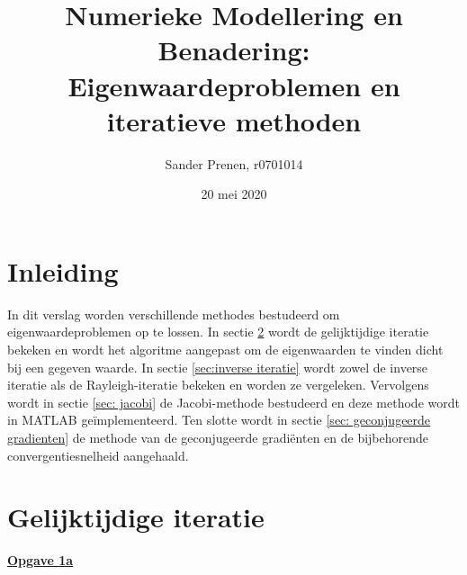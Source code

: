 \documentclass[a4paper, 12pt, titlepage, fleqn]{article}
\begin{document}
\title{\textbf{Numerieke Modellering en Benadering: Eigenwaardeproblemen en iteratieve methoden}}
\author{Sander Prenen, r0701014}

\date{20 mei 2020}
\begin{titlepage}
	\maketitle
	\thispagestyle{empty}
\end{titlepage}

\newpage
\tableofcontents
\listoffigures
\newpage

\section{Inleiding}
In dit verslag worden verschillende methodes bestudeerd om eigenwaardeproblemen op te lossen. In sectie \ref{sec:gelijktijdige iteratie} wordt de gelijktijdige iteratie bekeken en wordt het algoritme aangepast om de eigenwaarden te vinden dicht bij een gegeven waarde. In sectie \ref{sec:inverse iteratie} wordt zowel de inverse iteratie als de Rayleigh-iteratie bekeken en worden ze vergeleken. Vervolgens wordt in sectie \ref{sec: jacobi} de Jacobi-methode bestudeerd en deze methode wordt in MATLAB ge\"implementeerd. Ten slotte wordt in sectie \ref{sec: geconjugeerde gradienten} de methode van de geconjugeerde gradi\"enten en de bijbehorende convergentiesnelheid aangehaald.

\section{Gelijktijdige iteratie}\label{sec:gelijktijdige iteratie}
\underline{\textbf{Opgave 1a}}\\
\end{document}
